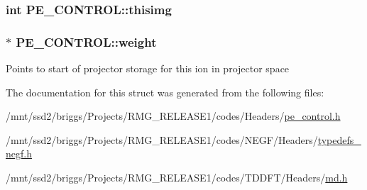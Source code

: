 \hypertarget{struct_p_e___c_o_n_t_r_o_l_ac7823a79e3055f308a3238f4d493804a}{
\subsubsection[{thisimg}]{\setlength{\rightskip}{0pt plus 5cm}int P\-E\-\_\-\-C\-O\-N\-T\-R\-O\-L\-::thisimg}}\label{struct_p_e___c_o_n_t_r_o_l_ac7823a79e3055f308a3238f4d493804a}
\hypertarget{struct_p_e___c_o_n_t_r_o_l_a70ae6abd5bfeb98cc47fbd63981119b0}{
\subsubsection[{weight}]{$\ast$ P\-E\-\_\-\-C\-O\-N\-T\-R\-O\-L\-::weight}}\label{struct_p_e___c_o_n_t_r_o_l_a70ae6abd5bfeb98cc47fbd63981119b0}
Points to start of projector storage for this ion in projector space 

The documentation for this struct was generated from the following files\-:\begin{DoxyCompactItemize}
\item 
/mnt/ssd2/briggs/\-Projects/\-R\-M\-G\-\_\-\-R\-E\-L\-E\-A\-S\-E1/codes/\-Headers/\hyperlink{pe__control_8h}{pe\-\_\-control.\-h}\item 
/mnt/ssd2/briggs/\-Projects/\-R\-M\-G\-\_\-\-R\-E\-L\-E\-A\-S\-E1/codes/\-N\-E\-G\-F/\-Headers/\hyperlink{typedefs__negf_8h}{typedefs\-\_\-negf.\-h}\item 
/mnt/ssd2/briggs/\-Projects/\-R\-M\-G\-\_\-\-R\-E\-L\-E\-A\-S\-E1/codes/\-T\-D\-D\-F\-T/\-Headers/\hyperlink{md_8h}{md.\-h}\end{DoxyCompactItemize}
